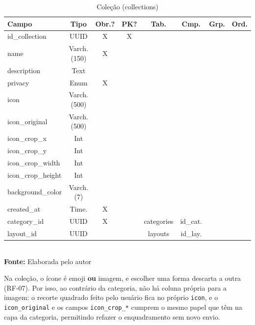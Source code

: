 \FloatBarrier
\begin{table}[!htbp]
\centering
\caption{Coleção (collections)}
\footnotesize
\begin{tabularx}{\textwidth}{ | X | c | c | c | c | c | c | c | }
    \hline
    \textbf{Campo} & \textbf{Tipo} & \textbf{Obr.?} & \textbf{PK?} & \textbf{Tab.} & \textbf{Cmp.} & \textbf{Grp.} & \textbf{Ord.}\\ \hline
    id\_collection & UUID & X & X &  &  &  &  \\ \hline
    name & Varch.(150) & X &  &  &  &  &  \\ \hline
    description & Text &  &  &  &  &  &  \\ \hline
    privacy & Enum & X &  &  &  &  &  \\ \hline
    icon & Varch.(500) &  &  &  &  &  &  \\ \hline
    icon\_original & Varch.(500) &  &  &  &  &  &  \\ \hline
    icon\_crop\_x & Int &  &  &  &  &  &  \\ \hline
    icon\_crop\_y & Int &  &  &  &  &  &  \\ \hline
    icon\_crop\_width & Int &  &  &  &  &  &  \\ \hline
    icon\_crop\_height & Int &  &  &  &  &  &  \\ \hline
    background\_color & Varch.(7) &  &  &  &  &  &  \\ \hline
    created\_at & Time. & X &  &  &  &  &  \\ \hline
    category\_id & UUID & X &  & categories & id\_cat. &  &  \\ \hline
    layout\_id & UUID &  &  & layouts & id\_lay. &  &  \\ \hline
\end{tabularx}
\vspace{0.1cm} \\ \textbf{Fonte:} Elaborada pelo autor
\label{tab:tabelaCollectionDetalhado}
\end{table}

Na coleção, o ícone é emoji \textbf{ou} imagem, e escolher uma forma descarta a outra (RF-07). Por
isso, ao contrário da categoria, não há coluna própria para a imagem: o recorte quadrado feito pelo
usuário fica no próprio \texttt{icon}, e o \texttt{icon\_original} e os campos
\texttt{icon\_crop\_*} cumprem o mesmo papel que têm na capa da categoria, permitindo refazer o
enquadramento sem novo envio.

